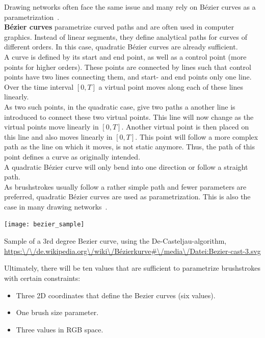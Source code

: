 Drawing networks often face the same issue and many rely on Bézier curves as a parametrization~\cite{SPIRAL, neuralpainters, learning2paint}.\\
\textbf{Bézier curves} parametrize curved paths and are often used in computer graphics.
Instead of linear segments, they define analytical paths for curves of different orders.
In this case, quadratic Bézier curves are already sufficient.\\
A curve is defined by its start and end point, as well as a control point (more points for higher orders).
These points are connected by lines such that control points have two lines connecting them, and start- and end points only one line.
Over the time interval $[0, T]$ a virtual point moves along each of these lines linearly.
\\
As two such points, in the quadratic case, give two paths a another line is introduced to connect these two virtual points.
This line will now change as the virtual points move linearly in $[0, T]$.
Another virtual point is then placed on this line and also moves linearly in $[0, T]$.
This point will follow a more complex path as the line on which it moves, is not static anymore.
Thus, the path of this point defines a curve as originally intended.\\
A quadratic Bézier curve will only bend into one direction or follow a straight path.\\
As brushstrokes usually follow a rather simple path and fewer parameters are preferred, quadratic Bézier curves are used as parametrization.
This is also the case in many drawing networks~\cite{SPIRAL, neuralpainters, learning2paint}.
\begin{marginfigure}
    \texttt{[image: bezier\_sample]}
    \caption[]{Sample of a 3rd degree Bezier curve, using the De-Casteljau-algorithm, \url{https:\/\/de.wikipedia.org\/wiki\/Bézierkurve\#\/media\/Datei:Bezier-cast-3.svg}}
\end{marginfigure}

Ultimately, there will be ten values that are sufficient to parametrize brushstrokes with certain constraints:
\begin{itemize}
    \item Three 2D coordinates that define the Bezier curves (six values).
    \item One brush size parameter.
    \item Three values in RGB space.
\end{itemize}

